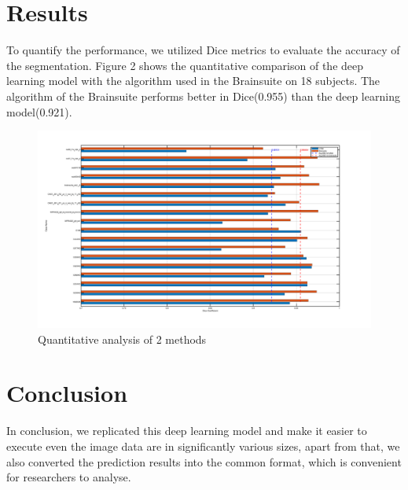 \documentclass[12pt]{article}
\begin{document}
\section{Results}
To quantify the performance, we utilized Dice metrics to evaluate the accuracy of the segmentation. Figure 2 shows the quantitative comparison of the deep learning model with the algorithm used in the Brainsuite on 18 subjects. The algorithm of the Brainsuite performs better in Dice(0.955) than the deep learning model(0.921).
\begin{figure}[H] 
\centering 
\includegraphics[width=1\textwidth]{DSC} 
\caption{Quantitative analysis of 2 methods} 
\label{DSC} 
\end{figure}

\section{Conclusion}
In conclusion, we replicated this deep learning model and make it easier to execute even the image data are in significantly various sizes, apart from that, we also converted the prediction results into the common format, which is convenient for researchers to analyse.




\end{document}
